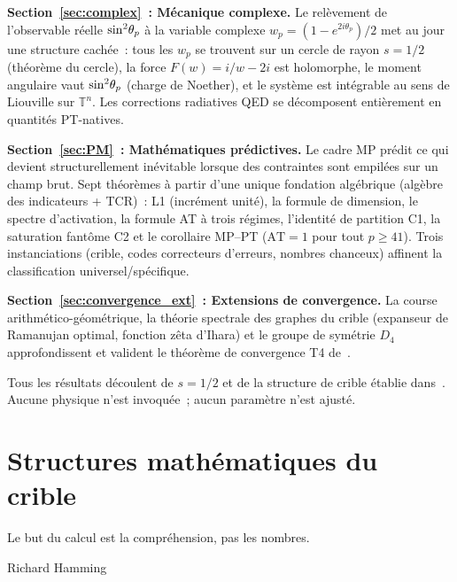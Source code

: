 \documentclass[12pt,a4paper]{article}
\begin{document}
\textbf{Section~\ref{sec:complex}~: Mécanique complexe.}
Le relèvement de l'observable réelle $\sin^2\!\theta_{p}$ à la variable
complexe $w_p = (1 - e^{2i\theta_p})/2$ met au jour une structure
cachée~: tous les $w_p$ se trouvent sur un cercle de rayon $s = 1/2$
(théorème du cercle), la force $F(w) = i/w - 2i$ est holomorphe, le
moment angulaire vaut $\sin^2\!\theta_{p}$ (charge de Noether), et le système
est intégrable au sens de Liouville sur $\mathbb{T}^n$. Les
corrections radiatives QED se décomposent entièrement en quantités
PT-natives.

\textbf{Section~\ref{sec:PM}~: Mathématiques prédictives.}
Le cadre MP prédit ce qui devient structurellement inévitable
lorsque des contraintes sont empilées sur un champ brut. Sept
théorèmes à partir d'une unique fondation algébrique (algèbre des
indicateurs + TCR)~: L1 (incrément unité), la formule de dimension,
le spectre d'activation, la formule AT à trois régimes, l'identité de
partition C1, la saturation fantôme C2 et le corollaire MP--PT
($\mathrm{AT} = 1$ pour tout $p \geq 41$). Trois instanciations
(crible, codes correcteurs d'erreurs, nombres chanceux) affinent la
classification universel/spécifique.

\textbf{Section~\ref{sec:convergence_ext}~: Extensions de
convergence.}
La course arithmético-géométrique, la théorie spectrale des graphes
du crible (expanseur de Ramanujan optimal, fonction zêta d'Ihara) et
le groupe de symétrie $D_4$ approfondissent et valident le théorème
de convergence T4 de~\cite{companion_M3}.

Tous les résultats découlent de $s = 1/2$ et de la structure de crible
établie dans~\cite{companion_M1,companion_M2,companion_M3}. Aucune
physique n'est invoquée~; aucun paramètre n'est ajusté.

\section{Structures mathématiques du crible}
\label{sec:math_structures}

\epigraph{Le but du calcul est la compréhension, pas les
nombres.}{Richard Hamming}
\end{document}
